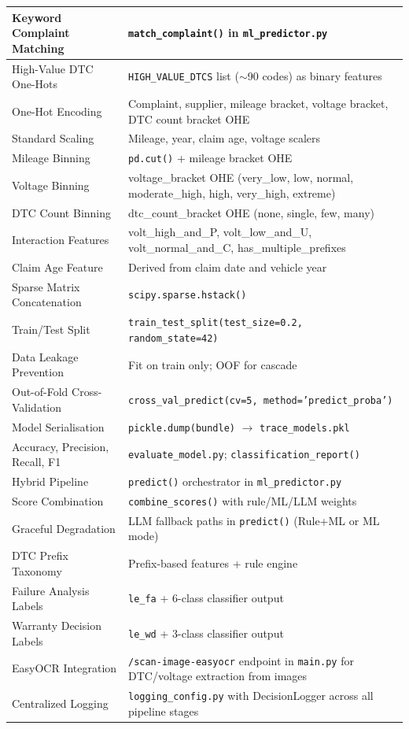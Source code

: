\documentclass[10pt]{article}
\begin{document}
\begin{table}[h!]
\begin{tabular}{|p{6cm}|p{8cm}|}
Keyword Complaint Matching & \texttt{match\_complaint()} in \texttt{ml\_predictor.py} \\ \hline
High-Value DTC One-Hots & \texttt{HIGH\_VALUE\_DTCS} list ($\sim$90 codes) as binary features \\ \hline
One-Hot Encoding & Complaint, supplier, mileage bracket, voltage bracket, DTC count bracket OHE \\ \hline
Standard Scaling & Mileage, year, claim age, voltage scalers \\ \hline
Mileage Binning & \texttt{pd.cut()} + mileage bracket OHE \\ \hline
Voltage Binning & voltage\_bracket OHE (very\_low, low, normal, moderate\_high, high, very\_high, extreme) \\ \hline
DTC Count Binning & dtc\_count\_bracket OHE (none, single, few, many) \\ \hline
Interaction Features & volt\_high\_and\_P, volt\_low\_and\_U, volt\_normal\_and\_C, has\_multiple\_prefixes \\ \hline
Claim Age Feature & Derived from claim date and vehicle year \\ \hline
Sparse Matrix Concatenation & \texttt{scipy.sparse.hstack()} \\ \hline
Train/Test Split & \texttt{train\_test\_split(test\_size=0.2, random\_state=42)} \\ \hline
Data Leakage Prevention & Fit on train only; OOF for cascade \\ \hline
Out-of-Fold Cross-Validation & \texttt{cross\_val\_predict(cv=5, method='predict\_proba')} \\ \hline
Model Serialisation & \texttt{pickle.dump(bundle)} $\rightarrow$ \texttt{trace\_models.pkl} \\ \hline
Accuracy, Precision, Recall, F1 & \texttt{evaluate\_model.py}; \texttt{classification\_report()} \\ \hline
Hybrid Pipeline & \texttt{predict()} orchestrator in \texttt{ml\_predictor.py} \\ \hline
Score Combination & \texttt{combine\_scores()} with rule/ML/LLM weights \\ \hline
Graceful Degradation & LLM fallback paths in \texttt{predict()} (Rule+ML or ML mode) \\ \hline
DTC Prefix Taxonomy & Prefix-based features + rule engine \\ \hline
Failure Analysis Labels & \texttt{le\_fa} + 6-class classifier output \\ \hline
Warranty Decision Labels & \texttt{le\_wd} + 3-class classifier output \\ \hline
EasyOCR Integration & \texttt{/scan-image-easyocr} endpoint in \texttt{main.py} for DTC/voltage extraction from images \\ \hline
Centralized Logging & \texttt{logging\_config.py} with DecisionLogger across all pipeline stages \\ \hline
\end{tabular}
\end{table}
\end{document}
